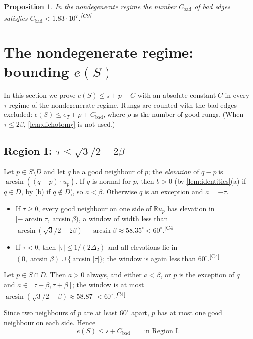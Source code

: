 \documentclass[11pt]{amsart}
\newtheorem{proposition}[theorem]{Proposition}
\theoremstyle{definition}
\theoremstyle{remark}
\newcommand{\R}{\mathbb{R}}
\newcommand{\Dt}{\Delta_2}
\newcommand{\chk}[1]{\textsuperscript{[#1]}}
\begin{document}
\begin{proposition}\label{prop:bad}
In the nondegenerate regime the number $C_{\mathrm{bad}}$ of bad edges satisfies $C_{\mathrm{bad}}<1.83\cdot10^7$.\chk{C9}
\end{proposition}

\section{The nondegenerate regime: bounding \texorpdfstring{$e(S)$}{e(S)}}\label{sec:regions}

In this section we prove $e(S)\le s+p+C$ with an absolute constant $C$ in every $\tau$-regime of the nondegenerate regime. Rungs are counted with the bad edges excluded: $e(S)\le e_T+\rho+C_{\mathrm{bad}}$, where $\rho$ is the number of good rungs. (When $\tau\le2\beta$, \cref{lem:dichotomy} is not used.)

\subsection{Region I: \texorpdfstring{$\tau\le\sqrt3/2-2\beta$}{tau <= sqrt3/2 - 2 beta}}\label{sec:regionI}
Let $p\in S\setminus D$ and let $q$ be a good neighbour of $p$; the \emph{elevation} of $q-p$ is $\arcsin((q-p)\cdot u_p)$. If $q$ is normal for $p$, then $b>0$ (by \cref{lem:identities}(a) if $q\in D$, by (b) if $q\notin D$), so $a<\beta$. Otherwise $q$ is an exception and $a=-\tau$.
\begin{itemize}[leftmargin=2em]
\item If $\tau\ge0$, every good neighbour on one side of $\R u_p$ has elevation in $[-\arcsin\tau,\arcsin\beta)$, a window of width less than $\arcsin(\sqrt3/2-2\beta)+\arcsin\beta\approx58.35^\circ<60^\circ$.\chk{C4}
\item If $\tau<0$, then $|\tau|\le1/(2\Dt)$ and all elevations lie in $(0,\arcsin\beta)\cup\{\arcsin|\tau|\}$; the window is again less than $60^\circ$.\chk{C4}
\end{itemize}
Let $p\in S\cap D$. Then $a>0$ always, and either $a<\beta$, or $p$ is the exception of $q$ and $a\in[\tau-\beta,\tau+\beta]$; the window is at most $\arcsin(\sqrt3/2-\beta)\approx58.87^\circ<60^\circ$.\chk{C4}

Since two neighbours of $p$ are at least $60^\circ$ apart, $p$ has at most one good neighbour on each side. Hence
\[
e(S)\le s+C_{\mathrm{bad}}\qquad\text{in Region I.}
\]
\end{document}
